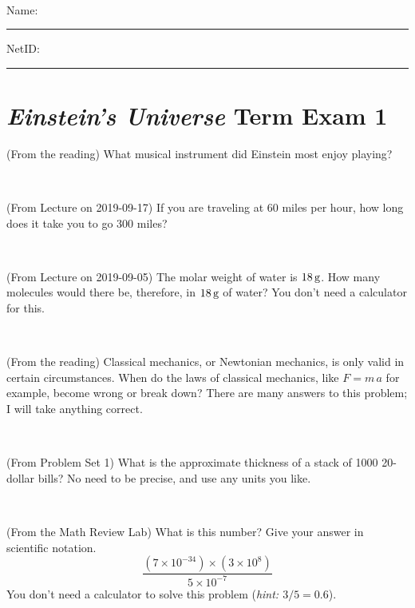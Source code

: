 \documentclass[12pt, letterpaper]{article}
\begin{document}
\vfill ~


\cleardoublepage



\noindent
Name: \rule[-1ex]{0.60\textwidth}{0.1pt}
NetID: \rule[-1ex]{0.20\textwidth}{0.1pt}

\section*{\textsl{Einstein's Universe} Term Exam 1}
\setcounter{problem}{1}


\begin{problem} (From the reading)
What musical instrument did Einstein most enjoy playing?
\end{problem}


\vfill ~

\begin{problem} (From Lecture on 2019-09-17)
If you are traveling at 60 miles per hour, how long does
it take you to go 300 miles?
\end{problem}


\vfill ~

\begin{problem} (From Lecture on 2019-09-05)
The molar weight of water is $18\,\mathrm{g}$. How many molecules would there
be, therefore, in $18\,\mathrm{g}$ of water? You don't need a calculator for
this.
\end{problem}


\vfill ~

\begin{problem} (From the reading)
Classical mechanics, or Newtonian mechanics, is only valid in certain
circumstances. When do the laws of classical mechanics, like $F =
m\,a$ for example, become wrong or break down? There are many answers
to this problem; I will take anything correct.
\end{problem}


\vfill ~


\clearpage


\begin{problem} (From Problem Set 1)
What is the approximate thickness of a stack of 1000 20-dollar bills?
No need to be precise, and use any units you like.
\end{problem}


\vfill ~

\begin{problem} (From the Math Review Lab)
What is this number? Give your answer in scientific notation.
$$
\frac{(7\times10^{-34})\times(3\times10^8)}{5\times10^{-7}}
$$
You don't need a calculator to solve this problem (\textit{hint: $3/5=0.6$}).
\end{problem}
\end{document}
